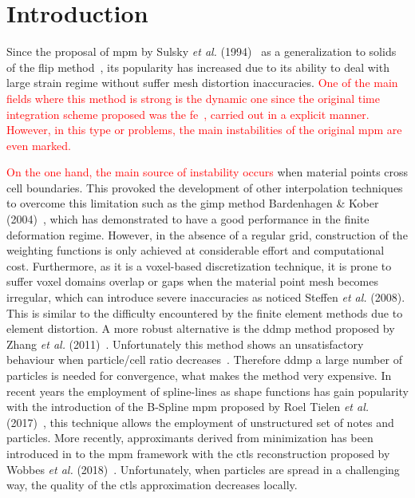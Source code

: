 \documentclass[preprint,12pt,a4paper]{elsarticle}
\newcommand{\PNA}[1]{
  \textcolor{red}{{#1}}
}
\begin{document}
\linenumbers

\section{Introduction}
\label{intro}
Since the proposal of \acrshort{mpm} by Sulsky {\it  et al.}
(1994)~\cite{Sulsky1994} as a generalization to solids of the \acrfull{flip} method~\cite{Brackbill1986}, its popularity
has increased due to its ability to deal with large strain regime
without suffer mesh distortion inaccuracies.\PNA{One of the main fields where this method is strong is the dynamic one since the original time integration scheme proposed was the \acrfull{fe}~\cite{Sulsky1994}, carried out in a explicit manner. However, in this type or problems, the main instabilities of the original \acrshort{mpm} are even marked.}

\PNA{On the one hand, the main source of instability occurs} when
material points cross cell boundaries. This provoked the development
of other interpolation techniques to overcome this limitation such as
the \acrfull{gimp} method Bardenhagen \& Kober (2004)~\cite{Bardenhagen2004}, which has
demonstrated to have a good performance in the finite deformation
regime. However, in the absence of a regular grid, construction of the
weighting functions is only achieved at considerable effort and
computational cost.  Furthermore, as it is a voxel-based
discretization technique, it is prone to suffer voxel domains overlap
or gaps when the material point mesh becomes irregular, which can
introduce severe inaccuracies as noticed Steffen {\it et al.}
(2008)\cite{Steffen2008}. This is similar to the difficulty
encountered by the finite element methods due to element distortion.
A more robust alternative is the \acrfull{ddmp} method proposed by Zhang {\it et al.}
(2011)~\cite{Zhang2011a}. Unfortunately this method shows an
unsatisfactory behaviour when particle/cell ratio
decreases~\cite{DHAKAL2016301}. Therefore \acrshort{ddmp} a large number of particles is needed for convergence, what
makes the method very expensive. In recent years the employment of
spline-lines as shape functions has gain popularity with the introduction of the B-Spline 
\acrshort{mpm} proposed by Roel Tielen {\it et al.} (2017)~\cite{TIELEN2017265},
this technique allows the employment of unstructured set of notes and
particles. More recently, approximants derived from minimization has
been introduced in to the \acrshort{mpm} framework with the \acrfull{ctls}
reconstruction proposed by Wobbes {\it et al.}
(2018)~\cite{E_Wobbes_2018}. Unfortunately, when particles are spread in
a challenging way, the quality of the \acrshort{ctls} approximation decreases locally.
\end{document}
